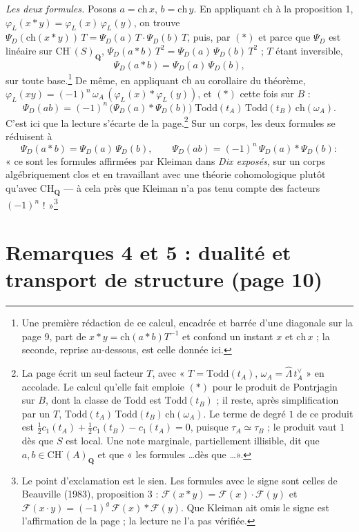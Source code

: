 \documentclass[11pt,a4paper]{article}
\begin{document}
\emph{Les deux formules.} Posons $a = \mathrm{ch}\,x$, $b = \mathrm{ch}\,y$.
En appliquant $\mathrm{ch}$ à la proposition 1, $\varphi_L(x * y) =
\varphi_L(x)\,\varphi_L(y)$, on trouve $\Psi_D(\mathrm{ch}(x * y))\,T =
\Psi_D(a)\,T\cdot\Psi_D(b)\,T$, puis, par $(*)$ et parce que $\Psi_D$ est
linéaire sur $\mathrm{CH}^{\cdot}(S)_{\mathbf{Q}}$, $\Psi_D(a * b)\,T^{2} =
\Psi_D(a)\,\Psi_D(b)\,T^{2}$ ; $T$ étant inversible,
\[
  \Psi_D(a * b) = \Psi_D(a)\,\Psi_D(b),
\]
sur toute base.\footnote{Une première rédaction de ce calcul, encadrée et
barrée d'une diagonale sur la page 9, part de $x * y = \mathrm{ch}(a * b)
T^{-1}$ et confond un instant $x$ et $\mathrm{ch}\,x$ ; la seconde, reprise
au-dessous, est celle donnée ici.} De même, en appliquant $\mathrm{ch}$ au
corollaire du théorème, $\varphi_L(xy) = (-1)^n\,\omega_A\,(\varphi_L(x) *
\varphi_L(y))$, et $(*)$ cette fois sur $B$ :
\[
  \Psi_D(ab) = (-1)^n\,\bigl(\Psi_D(a) * \Psi_D(b)\bigr)\;
  \mathrm{Todd}(t_A)\,\mathrm{Todd}(t_B)\,\mathrm{ch}(\omega_A).
\]
C'est ici que la lecture s'écarte de la page.\footnote{La page écrit un seul facteur $T$, avec « $T = \mathrm{Todd}(t_A)$,
$\omega_A = \hat\Lambda\,t_A^{\vee}$ » en accolade. Le calcul qu'elle fait
emploie $(*)$ pour le produit de Pontrjagin sur $B$, dont la classe de Todd
est $\mathrm{Todd}(t_B)$ ; il reste, après simplification par un $T$,
$\mathrm{Todd}(t_A)\,\mathrm{Todd}(t_B)\,\mathrm{ch}(\omega_A)$. Le terme de
degré $1$ de ce produit est $\frac{1}{2}c_1(t_A) + \frac{1}{2}c_1(t_B) -
c_1(t_A) = 0$, puisque $\tau_A \simeq \tau_B$ ; le produit vaut $1$ dès que
$S$ est local. Une note marginale, partiellement illisible, dit que $a, b \in
\mathrm{CH}^{\cdot}(A)_{\mathbf{Q}}$ et que « les formules \ldots dès que
\ldots ».} Sur un corps, les deux formules se réduisent à
\[
  \Psi_D(a * b) = \Psi_D(a)\,\Psi_D(b),
  \qquad
  \Psi_D(ab) = (-1)^n\,\Psi_D(a) * \Psi_D(b) :
\]
« ce sont les formules affirmées par Kleiman dans \emph{Dix exposés}, sur un
corps algébriquement clos et en travaillant avec une théorie cohomologique
plutôt qu'avec $\mathrm{CH}_{\mathbf{Q}}$ — à cela près que Kleiman n'a pas
tenu compte des facteurs $(-1)^n$ ! »\footnote{Le point d'exclamation est le
sien. Les formules avec le signe sont celles de Beauville (1983),
proposition 3 : $\mathcal{F}(x * y) = \mathcal{F}(x)\cdot\mathcal{F}(y)$ et
$\mathcal{F}(x \cdot y) = (-1)^g\,\mathcal{F}(x) * \mathcal{F}(y)$. Que
Kleiman ait omis le signe est l'affirmation de la page ; la lecture ne l'a
pas vérifiée.}

\section*{Remarques 4 et 5 : dualité et transport de structure (page 10)}
\end{document}
